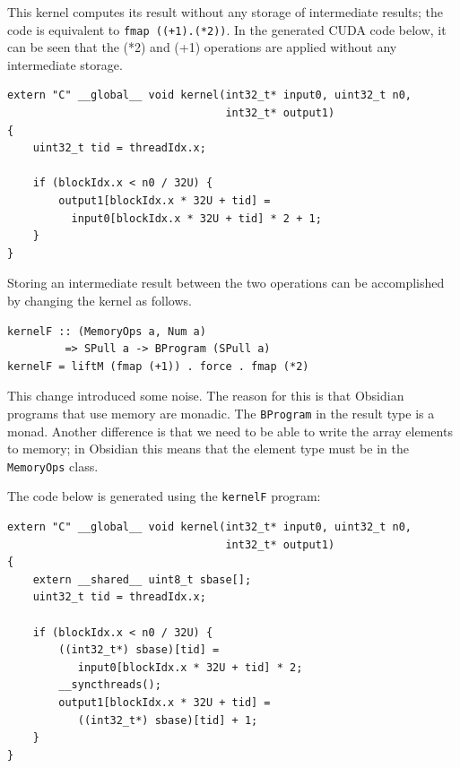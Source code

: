 \documentclass[a4paper]{book}
\begin{document}
\noindent This kernel computes its result without any storage of intermediate results;
the code is equivalent to \verb!fmap ((+1).(*2))!. 
In the generated CUDA code below, it can be seen that the (*2) and (+1) operations 
are applied without any intermediate storage. 

\begin{small}
\begin{Verbatim}[samepage=true]
extern "C" __global__ void kernel(int32_t* input0, uint32_t n0,
                                  int32_t* output1)
{
    uint32_t tid = threadIdx.x;
    
    if (blockIdx.x < n0 / 32U) {
        output1[blockIdx.x * 32U + tid] = 
          input0[blockIdx.x * 32U + tid] * 2 + 1;
    }
}
\end{Verbatim}
\end{small}

Storing an intermediate result between the two operations can be accomplished by 
changing the kernel as follows. 

\begin{small}
\begin{Verbatim}[samepage=true]
kernelF :: (MemoryOps a, Num a)
         => SPull a -> BProgram (SPull a)
kernelF = liftM (fmap (+1)) . force . fmap (*2)
\end{Verbatim} 
\end{small} 

This change introduced some noise. The reason for this is that Obsidian programs that 
use memory are monadic. The {\tt BProgram} in the result type is a monad. Another difference 
is that we need to be able to write the array elements to memory; in Obsidian this means 
that the element type must be in the {\tt MemoryOps} class. 

The code below is generated using the {\tt kernelF} program: 

\begin{small} 
\begin{Verbatim}[samepage=true]
extern "C" __global__ void kernel(int32_t* input0, uint32_t n0,
                                  int32_t* output1)
{
    extern __shared__ uint8_t sbase[];
    uint32_t tid = threadIdx.x;
    
    if (blockIdx.x < n0 / 32U) {
        ((int32_t*) sbase)[tid] = 
           input0[blockIdx.x * 32U + tid] * 2;
        __syncthreads();
        output1[blockIdx.x * 32U + tid] = 
           ((int32_t*) sbase)[tid] + 1;
    }
}
\end{Verbatim}
\end{small} 
\end{document}
